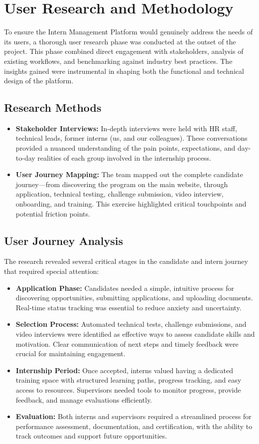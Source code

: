 \section{User Research and Methodology}
\noindent
To ensure the Intern Management Platform would genuinely address the needs of its users, a thorough user research phase was conducted at the outset of the project. This phase combined direct engagement with stakeholders, analysis of existing workflows, and benchmarking against industry best practices. The insights gained were instrumental in shaping both the functional and technical design of the platform.

\subsection{Research Methods}
\begin{itemize}
    \item \textbf{Stakeholder Interviews:} In-depth interviews were held with HR staff, technical leads, former interns (us, and our colleagues). These conversations provided a nuanced understanding of the pain points, expectations, and day-to-day realities of each group involved in the internship process.
    \item \textbf{User Journey Mapping:} The team mapped out the complete candidate journey—from discovering the program on the main website, through application, technical testing, challenge submission, video interview, onboarding, and training. This exercise highlighted critical touchpoints and potential friction points.
\end{itemize}

\subsection{User Journey Analysis}
The research revealed several critical stages in the candidate and intern journey that required special attention:
\begin{itemize}
    \item \textbf{Application Phase:} Candidates needed a simple, intuitive process for discovering opportunities, submitting applications, and uploading documents. Real-time status tracking was essential to reduce anxiety and uncertainty.
    \item \textbf{Selection Process:} Automated technical tests, challenge submissions, and video interviews were identified as effective ways to assess candidate skills and motivation. Clear communication of next steps and timely feedback were crucial for maintaining engagement.
    \item \textbf{Internship Period:} Once accepted, interns valued having a dedicated training space with structured learning paths, progress tracking, and easy access to resources. Supervisors needed tools to monitor progress, provide feedback, and manage evaluations efficiently.
    \item \textbf{Evaluation:} Both interns and supervisors required a streamlined process for performance assessment, documentation, and certification, with the ability to track outcomes and support future opportunities.
\end{itemize}


